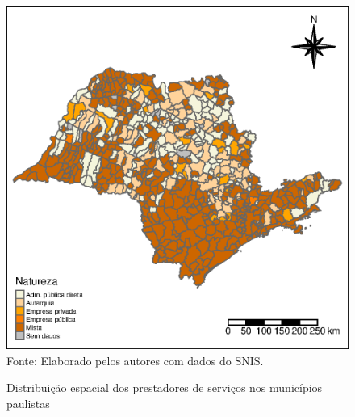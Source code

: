 \begin{figure}[H]
        \centering
        	\begin{minipage}{0.6\textwidth}	
                \caption{Distribuição espacial dos prestadores de serviços nos municípios paulistas}
                \includegraphics[scale=0.8]{figures/m1.eps}                 
            	\footnotesize \\
            		Fonte: Elaborado pelos autores com dados do SNIS.
    	\label{f:maps15}
	\end{minipage}
\end{figure}
